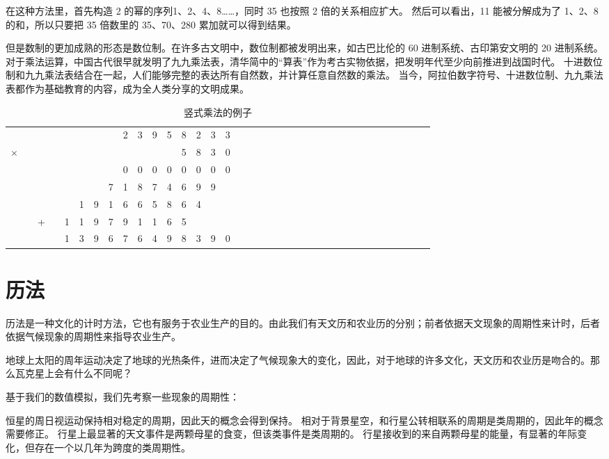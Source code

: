 \documentclass[a4paper,10.5pt]{book}
\begin{document}
在这种方法里，首先构造 2 的幂的序列1、2、4、8……，同时 35 也按照 2 倍的关系相应扩大。
然后可以看出，11 能被分解成为了 1、2、8 的和，所以只要把 35 倍数里的 35、70、280 累加就可以得到结果。

但是数制的更加成熟的形态是数位制。在许多古文明中，数位制都被发明出来，如古巴比伦的 60 进制系统、古印第安文明的 20 进制系统。
对于乘法运算，中国古代很早就发明了九九乘法表，清华简中的“算表”作为考古实物依据，把发明年代至少向前推进到战国时代。
十进数位制和九九乘法表结合在一起，人们能够完整的表达所有自然数，并计算任意自然数的乘法。
当今，阿拉伯数字符号、十进数位制、九九乘法表都作为基础教育的内容，成为全人类分享的文明成果。

\begin{table}[tbhp]
\centering
\begin{tabular}{cccccccccccccccccccccccccccccccccccc}
  &   &   &   &   &   &   &   & 2 & 3 & 9 & 5 & 8 & 2 & 3 & 3\\
× &   &   &   &   &   &   &   &   &   &   &   & 5 & 8 & 3 & 0\\
\hline
  &   &   &   &   &   &   &   & 0 & 0 & 0 & 0 & 0 & 0 & 0 & 0\\
  &   &   &   &   &   &   & 7 & 1 & 8 & 7 & 4 & 6 & 9 & 9 &  \\
  &   &   &   &   & 1 & 9 & 1 & 6 & 6 & 5 & 8 & 6 & 4 &   &  \\
  &   & + &   & 1 & 1 & 9 & 7 & 9 & 1 & 1 & 6 & 5 &   &   &  \\
\hline
  &   &   &   & 1 & 3 & 9 & 6 & 7 & 6 & 4 & 9 & 8 & 3 & 9 & 0\\
\end{tabular}
\caption{竖式乘法的例子}
\end{table}

\section{历法}

历法是一种文化的计时方法，它也有服务于农业生产的目的。由此我们有天文历和农业历的分别；前者依据天文现象的周期性来计时，后者依据气候现象的周期性来指导农业生产。

地球上太阳的周年运动决定了地球的光热条件，进而决定了气候现象大的变化，因此，对于地球的许多文化，天文历和农业历是吻合的。那么瓦克星上会有什么不同呢？

基于我们的数值模拟，我们先考察一些现象的周期性：

恒星的周日视运动保持相对稳定的周期，因此天的概念会得到保持。
相对于背景星空，和行星公转相联系的周期是类周期的，因此年的概念需要修正。
行星上最显著的天文事件是两颗母星的食变，但该类事件是类周期的。
行星接收到的来自两颗母星的能量，有显著的年际变化，但存在一个以几年为跨度的类周期性。
\end{document}
